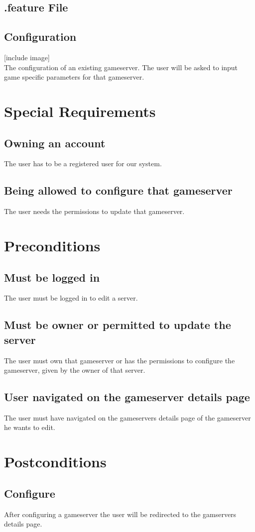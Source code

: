 \documentclass[a4paper,12pt,chapterprefix=false,bibliography=totoc,listof=totoc,]{scrreprt}
\begin{document}
\section{.feature File}



\section{Configuration}
[include image]\\
The configuration of an existing gameserver. The user will be asked to input game specific parameters for that gameserver.

\chapter{Special Requirements}

\section{Owning an account}
The user has to be a registered user for our system.

\section{Being allowed to configure that gameserver}
The user needs the permissions to update that gameserver.

\chapter{Preconditions}
\section{Must be logged in}
The user must be logged in to edit a server.

\section{Must be owner or permitted to update the server}
The user must own that gameserver or has the permissions to configure the gameserver, given by the owner of that server.

\section{User navigated on the gameserver details page}
The user must have navigated on the gameservers details page of the gameserver he wants to edit.

\chapter{Postconditions}

\section{Configure}
After configuring a gameserver the user will be redirected to the gamservers details page.
\end{document}
